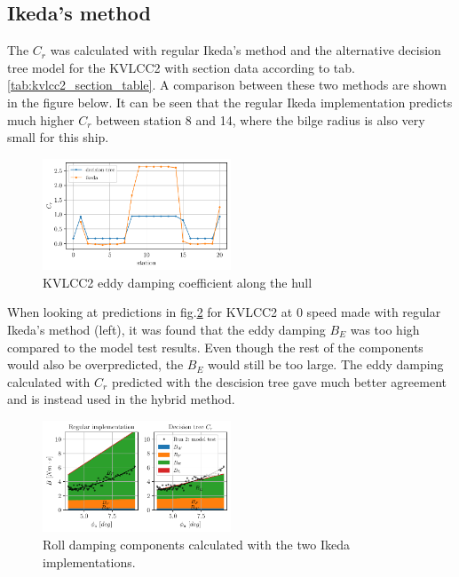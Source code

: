     \subsection{Ikeda's method}\label{ikedas-method}

    The $C_r$ was calculated with regular Ikeda's method and the
alternative decision tree model for the KVLCC2 with section data
according to tab.\ref{tab:kvlcc2_section_table}. A comparison
between these two methods are shown in the figure below. It can be seen
that the regular Ikeda implementation predicts much higher $C_r$
between station 8 and 14, where the bilge radius is also very small for
this ship.

    \begin{figure}[H]
        \begin{center}\includegraphics[width = 0.5\textwidth]{figures/kvlcc2_eddy.pdf}\end{center}
        \vspace{-1cm}
        \caption{KVLCC2 eddy damping coefficient along the hull}
        \label{fig:kvlcc2_eddy}
    \end{figure}
    
    When looking at predictions in fig.\ref{fig:ikeda} for KVLCC2 at
0 speed made with regular Ikeda's method (left), it was found that the
eddy damping $B_E$ was too high compared to the model test results.
Even though the rest of the components would also be overpredicted, the
$B_E$ would still be too large. The eddy damping calculated with
$C_r$ predicted with the descision tree gave much better agreement and
is instead used in the hybrid method.

    

    \begin{figure}[H]
        \begin{center}\includegraphics[width = 0.5\textwidth]{figures/ikeda.pdf}\end{center}
        \vspace{-1cm}
        \caption{Roll damping components calculated with the two Ikeda implementations.}
        \label{fig:ikeda}
    \end{figure}
    
